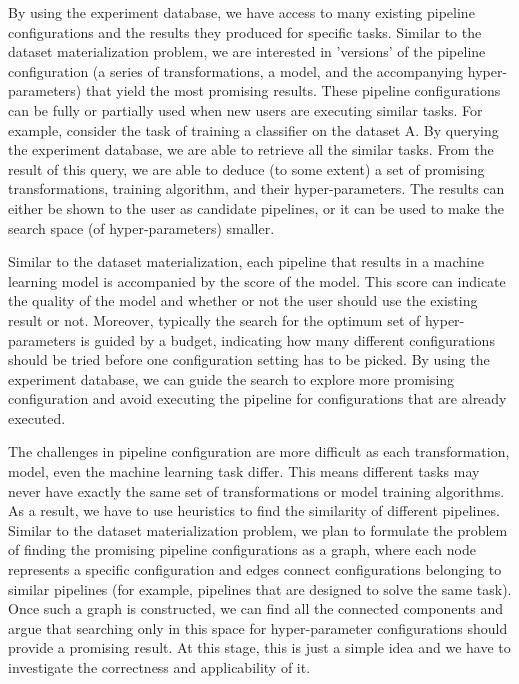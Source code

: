 \documentclass{sig-alternate-05-2015}
\begin{document}
By using the experiment database, we have access to many existing pipeline configurations and the results they produced for specific tasks.
Similar to the dataset materialization problem, we are interested in 'versions' of the pipeline configuration (a series of transformations, a model, and the accompanying hyper-parameters) that yield the most promising results.
These pipeline configurations can be fully or partially used when new users are executing similar tasks.
For example, consider the task of training a classifier on the dataset A.
By querying the experiment database, we are able to retrieve all the similar tasks.
From the result of this query, we are able to deduce (to some extent) a set of promising transformations, training algorithm, and their hyper-parameters.
The results can either be shown to the user as candidate pipelines, or it can be used to make the search space (of hyper-parameters) smaller.

Similar to the dataset materialization, each pipeline that results in a machine learning model is accompanied by the score of the model.
This score can indicate the quality of the model and whether or not the user should use the existing result or not.
Moreover, typically the search for the optimum set of hyper-parameters is guided by a budget, indicating how many different configurations should be tried before one configuration setting has to be picked.
By using the experiment database, we can guide the search to explore more promising configuration and avoid executing the pipeline for configurations that are already executed.

The challenges in pipeline configuration are more difficult as each transformation, model, even the machine learning task differ.
This means different tasks may never have exactly the same set of transformations or model training algorithms.
As a result, we have to use heuristics to find the similarity of different pipelines.
Similar to the dataset materialization problem, we plan to formulate the problem of finding the promising pipeline configurations as a graph, where each node represents a specific configuration and edges connect configurations belonging to similar pipelines (for example, pipelines that are designed to solve the same task).
Once such a graph is constructed, we can find all the connected components and argue that searching only in this space for hyper-parameter configurations should provide a promising result.
At this stage, this is just a simple idea and we have to investigate the correctness and applicability of it.
\end{document}

